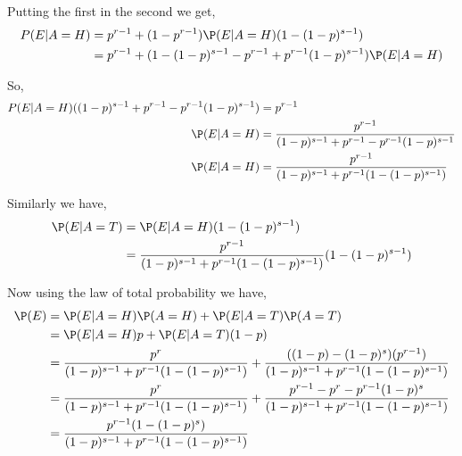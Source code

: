 \documentclass[a4paper]{report}
\begin{document}
Putting the first in the second we get, 
\begin{align*}
P(E | A = H)  &=   p^{r - 1} + (1 - p^{r - 1})\P(E | A =H)(1 - (1 - p)^{s - 1})\\
              &= p^{r - 1} + (1 - (1 - p)^{s - 1} -p^{r - 1} + p^{r - 1}(1 - p)^{s - 1})\P(E | A = H)\\
\end{align*}

So, 
\begin{align*}
 P(E | A = H)((1 - p)^{s - 1} +p^{r - 1} - p^{r - 1}(1 - p)^{s - 1}) &= p^{r - 1}\\
 \P(E | A = H)  &= \frac{p^{r - 1}}{(1 - p)^{s - 1} +p^{r - 1} - p^{r - 1}(1 - p)^{s - 1}}\\
 \P(E | A = H)  &= \frac{p^{r - 1}}{(1 - p)^{s - 1} +p^{r - 1} (1 - (1 - p)^{s - 1})}\\
\end{align*}

Similarly we have,
\begin{align*}
\P(E | A = T)  &=    \P(E | A =H)(1 - (1 - p)^{s - 1})\\
               &= \frac{p^{r - 1}}{(1 - p)^{s - 1} +p^{r - 1} (1 - (1 - p)^{s - 1})}(1 - (1 - p)^{s - 1})
\end{align*}


Now using the law of total probability we have, 
\begin{align*}
    \P(E) &= \P(E | A = H) \P(A = H) + \P(E | A = T)\P(A = T)\\
          &= \P(E | A = H) p + \P(E | A = T)(1 - p)\\
          &= \frac{p^{r}}{(1 - p)^{s - 1} +p^{r - 1} (1 - (1 - p)^{s - 1})} + \frac{((1 - p) - (1 - p)^{s})(p^{r - 1})}{(1 - p)^{s - 1} +p^{r - 1} (1 - (1 - p)^{s - 1})}\\
          &= \frac{p^{r}}{(1 - p)^{s - 1} +p^{r - 1} (1 - (1 - p)^{s - 1})} + \frac{p^{r - 1} - p^{r} - p^{r - 1}(1 - p)^{s}}{(1 - p)^{s - 1} +p^{r - 1} (1 - (1 - p)^{s - 1})}\\
          &= \frac{p^{r - 1}(1 - (1 - p)^{s})}{(1 - p)^{s - 1} +p^{r - 1} (1 - (1 - p)^{s - 1})} 
\end{align*}
\end{document}
